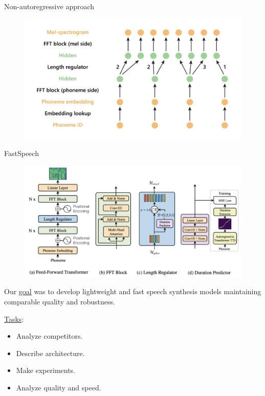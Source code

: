 \begin{frame}{Non-autoregressive approach}
\begin{figure}[H]
\centering
\includegraphics[width=1.0\textwidth]{images/fastspeech/alignment.png}
\end{figure}
\end{frame}

\begin{frame}{FastSpeech}
\begin{figure}[H]
\centering
\includegraphics[width=1.0\textwidth]{images/related-work/fastspeech.png}
\end{figure}
\end{frame}

\begin{frame}
Our \underline{goal} was to develop lightweight and fast speech synthesis models maintaining comparable quality and robustness.

\underline{Tasks}:
\begin{itemize}
    \item Analyze competitors.
    \item Describe architecture.
    \item Make experiments.
    \item Analyze quality and speed.
\end{itemize}
\end{frame}

